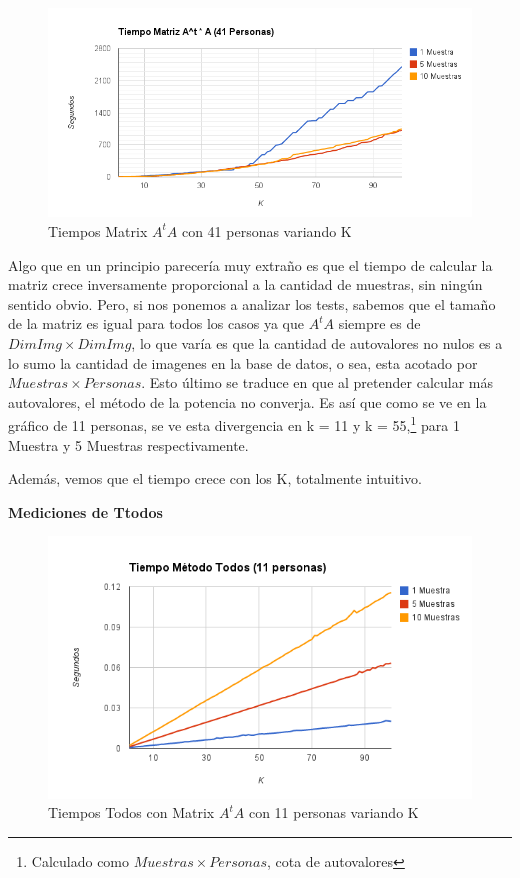 \begin{figure}[H]
\includegraphics[width=1\textwidth]{img/image3.png}
     \caption{Tiempos Matrix $A^tA$ con 41 personas variando K}
\end{figure}

Algo que en un principio parecería muy extraño es que el tiempo de calcular la matriz crece
inversamente proporcional a la cantidad de muestras, sin ningún sentido obvio. Pero, si nos ponemos
a analizar los tests, sabemos que el tamaño de la matriz es igual para todos los casos ya que $A^tA$
siempre es de $DimImg \times DimImg$, lo que var\'ia es que la cantidad de autovalores no nulos es a
lo sumo la cantidad de imagenes en la base de datos, o sea, esta acotado por $Muestras \times
Personas$. Esto \'ultimo se traduce en que al pretender calcular m\'as autovalores, el m\'etodo de
la potencia no converja. Es as\'i que como se ve en la gr\'afico de 11 personas, se ve esta
divergencia en k = 11 y k = 55,\footnote{Calculado como $Muestras \times Personas$, cota de
  autovalores} para 1 Muestra y 5 Muestras respectivamente.

Además, vemos que el tiempo crece con los K, totalmente intuitivo.

\textbf{Mediciones de Ttodos }

\begin{figure}[H]
\includegraphics[width=1\textwidth]{img/image4.png}
     \caption{Tiempos Todos con Matrix $A^tA$ con 11 personas variando K}
\end{figure}

